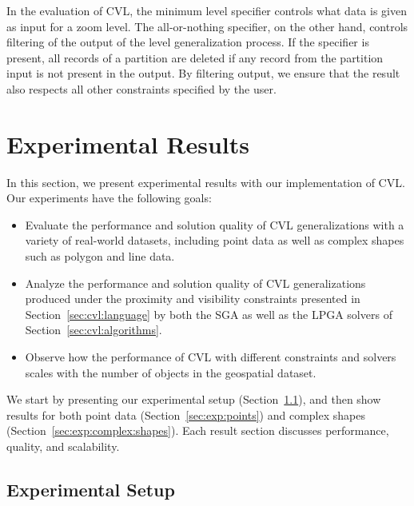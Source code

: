 \documentclass[11pt, oneside]{report}
\begin{document}
In the evaluation of CVL, the minimum level specifier controls what data is given as input for a zoom level. The all-or-nothing specifier, on the other hand, controls filtering of the output of the level generalization process. If the specifier is present, all records of a partition are deleted if any record from the partition input is not present in the output. By filtering output, we ensure that the result also respects all other constraints specified by the user. 

\section{Experimental Results}
\label{sec:experimental}


In this section, we present experimental results with our implementation of CVL. Our experiments have the following goals:

\begin{itemize}

\item Evaluate the performance and solution quality of CVL generalizations with a variety of real-world datasets, including point data as well as complex shapes such as polygon and line data. 

\item Analyze the performance and solution quality of CVL generalizations produced under the proximity and visibility constraints presented in Section~\ref{sec:cvl:language} by both the SGA as well as the LPGA solvers of Section~\ref{sec:cvl:algorithms}.

\item Observe how the performance of CVL with different constraints and solvers scales with the number of objects in the geospatial dataset.

\end{itemize}

We start by presenting our experimental setup (Section~\ref{sec:exp:setup}), and then show results for both point data (Section~\ref{sec:exp:points}) and complex shapes (Section~\ref{sec:exp:complex:shapes}). Each result section discusses performance, quality, and scalability.


\subsection{Experimental Setup}
\label{sec:exp:setup}
\end{document}

